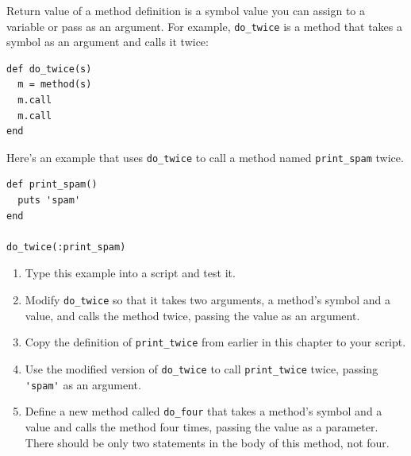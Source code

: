 \documentclass[10pt]{book}
\begin{document}
\begin{exercise}

Return value of a method definition is a symbol value you can assign to a variable
or pass as an argument.  For example, \verb"do_twice" is a method
that takes a symbol as an argument and calls it twice:

\begin{verbatim}
def do_twice(s)
  m = method(s)
  m.call
  m.call
end
\end{verbatim}

Here's an example that uses \verb"do_twice" to call a method
named \verb"print_spam" twice.

\begin{verbatim}
def print_spam()
  puts 'spam'
end

do_twice(:print_spam)
\end{verbatim}

\begin{enumerate}

\item Type this example into a script and test it.

\item Modify \verb"do_twice" so that it takes two arguments, a
method's symbol and a value, and calls the method twice,
passing the value as an argument.

\item Copy the definition of 
\verb"print_twice" from earlier in this chapter to your script.

\item Use the modified version of \verb"do_twice" to call
\verb"print_twice" twice, passing \verb"'spam'" as an argument.

\item Define a new method called 
\verb"do_four" that takes a method's symbol and a value
and calls the method four times, passing the value
as a parameter.  There should be only
two statements in the body of this method, not four.

\end{enumerate}


\end{exercise}
\end{document}
